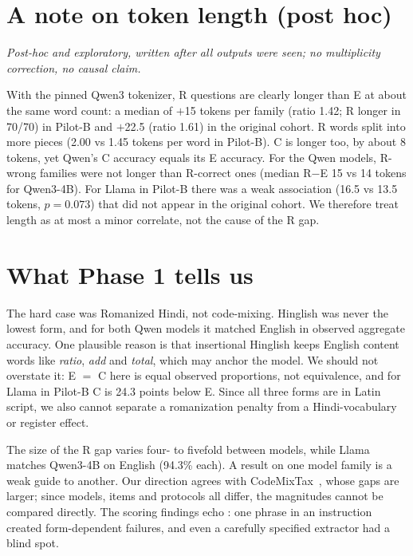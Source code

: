 \documentclass[12pt,a4paper,oneside]{report}
\renewcommand{\_}{\oldunderscore\allowbreak}
\begin{document}
\section{A note on token length (post hoc)}

\noindent\textit{Post-hoc and exploratory, written after all outputs were seen; no multiplicity correction, no causal claim.}

With the pinned Qwen3 tokenizer, R questions are clearly longer than E at about the same word count: a median of $+$15 tokens per family (ratio 1.42; R longer in 70/70) in Pilot-B and $+$22.5 (ratio 1.61) in the original cohort. R words split into more pieces (2.00 vs 1.45 tokens per word in Pilot-B). C is longer too, by about 8 tokens, yet Qwen's C accuracy equals its E accuracy. For the Qwen models, R-wrong families were not longer than R-correct ones (median R$-$E 15 vs 14 tokens for Qwen3-4B). For Llama in Pilot-B there was a weak association (16.5 vs 13.5 tokens, $p = 0.073$) that did not appear in the original cohort. We therefore treat length as at most a minor correlate, not the cause of the R gap.

\section{What Phase 1 tells us}

The hard case was Romanized Hindi, not code-mixing. Hinglish was never the lowest form, and for both Qwen models it matched English in observed aggregate accuracy. One plausible reason is that insertional Hinglish keeps English content words like \emph{ratio}, \emph{add} and \emph{total}, which may anchor the model. We should not overstate it: E $=$ C here is equal observed proportions, not equivalence, and for Llama in Pilot-B C is 24.3 points below E. Since all three forms are in Latin script, we also cannot separate a romanization penalty from a Hindi-vocabulary or register effect.

The size of the R gap varies four- to fivefold between models, while Llama matches Qwen3-4B on English (94.3\% each). A result on one model family is a weak guide to another. Our direction agrees with CodeMixTax~\citep{sthanika-2026-codemix}, whose gaps are larger; since models, items and protocols all differ, the magnitudes cannot be compared directly. The scoring findings echo \citet{peter-etal-2026-mind}: one phrase in an instruction created form-dependent failures, and even a carefully specified extractor had a blind spot.
\end{document}

